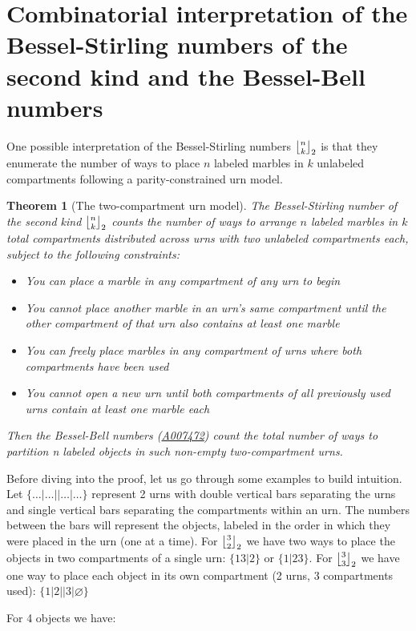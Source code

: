 \documentclass[a4paper]{amsart}
\newcommand{\mStirling}[0]{\genfrac{\lfloor}{\rfloor}{0pt}{}}
\newtheorem{theorem}{Theorem}
\begin{document}
\section{Combinatorial interpretation of the Bessel-Stirling numbers of the second kind and the Bessel-Bell numbers}\label{sec-combinatorial}
\noindent One possible interpretation of the Bessel-Stirling numbers $\mStirling{n}{k}_2$ is that they enumerate the number of ways to place $n$ labeled marbles in $k$ unlabeled compartments following a parity-constrained urn model.
\begin{theorem}[The two-compartment urn model]\label{thm-urn-model}
The Bessel-Stirling number of the second kind $\mStirling{n}{k}_2$ counts the number of ways to arrange $n$ labeled marbles in $k$ total compartments distributed across urns with two unlabeled compartments each, subject to the following constraints:
\begin{itemize}
    \renewcommand\labelitemi{--}
    \item You can place a marble in any compartment of any urn to begin
    \item You cannot place another marble in an urn's same compartment until the other compartment of that urn also contains at least one marble
    \item You can freely place marbles in any compartment of urns where both compartments have been used
    \item You cannot open a new urn until both compartments of all previously used urns contain at least one marble each
\end{itemize}
Then the Bessel-Bell numbers (\href{https://oeis.org/A007472}{A007472}) count the total number of ways to partition n labeled objects in such non-empty two-compartment urns.
\end{theorem}

Before diving into the proof, let us go through some examples to build intuition. Let $\{\dots|\dots||\dots|\dots \}$ represent 2 urns with double vertical bars separating the urns and single vertical bars separating the compartments within an urn. The numbers between the bars will represent the objects, labeled in the order in which they were placed in the urn (one at a time).
For $\mStirling{3}{2}_2$ we have two ways to place the objects in two compartments of a single urn: $\{13|2\}$ or $\{1|23\}$.
For $\mStirling{3}{3}_2$ we have one way to place each object in its own compartment (2 urns, 3 compartments used): $\{1|2||3|\varnothing\}$

For 4 objects we have:
\end{document}
